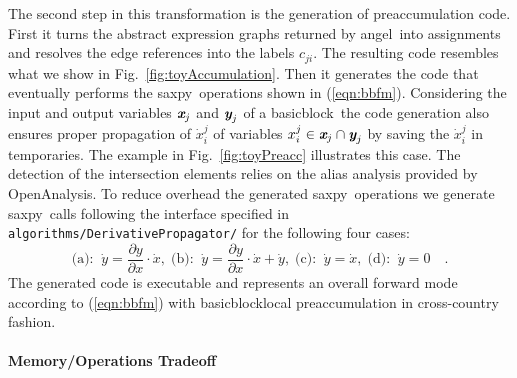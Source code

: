 \documentclass[11pt]{article}
\newcommand{\angel}{angel}
\newcommand{\basicblock}{basicblock}
\newcommand{\OpenAnalysis}{OpenAnalysis}
\newcommand{\saxpy}{saxpy}
\newcommand{\bmx}{\mbox{\bf\em x}}
\newcommand{\bmy}{\mbox{\bf\em y}}
\newcommand{\code}[1]{{\small\tt{#1}}}
\newcommand{\reffig}[1]{{Fig.~\ref{#1}}}
\newcommand{\refeqn}[1]{{(\ref{#1})}}
\begin{document}
The second step in this transformation is the generation of 
preaccumulation code. 
First it  turns the abstract expression graphs returned by \angel\ 
into assignments and resolves the edge references into 
the  labels $c_{ji}$. The resulting code resembles what 
we show in  \reffig{fig:toyAccumulation}. 
Then it generates the code that eventually performs the \saxpy\ 
operations shown in \refeqn{eqn:bbfm}. 
Considering the input and output variables $\bmx_j$ and $\bmy_j$ of a \basicblock\ the code generation 
also ensures proper propagation of $\dot{x}_i^j$ of variables $ x_i^j \in  \bmx_j \cap \bmy_j$ 
by saving the $\dot{x}_i^j$ in temporaries. The example in \reffig{fig:toyPreacc} illustrates this case. 
The detection of the intersection elements relies on the alias analysis provided by 
\OpenAnalysis.
To reduce overhead 
the generated \saxpy\ operations we generate \saxpy\ calls following the 
interface specified in \code{algorithms/DerivativePropagator/} for the following four cases:
\begin{equation}\label{eqn:fourSaxpy}  
\mbox{(a):}\;\;\dot{y} = \frac{\partial y }{\partial x }\cdot \dot{x},\; 
\mbox{(b):}\;\;\dot{y} = \frac{\partial y }{\partial x }\cdot \dot{x} + \dot{y},\; 
\mbox{(c):}\;\;\dot{y} = \dot{x},\;
\mbox{(d):}\;\;\dot{y} = 0\quad .
\end{equation}	
The generated code is executable and represents an overall forward mode 
according to \refeqn{eqn:bbfm} with \basicblock\-local preaccumulation in 
cross-country fashion. 

\paragraph{Memory/Operations Tradeoff}\label{sssec:MMTradeOff}
\end{document}
